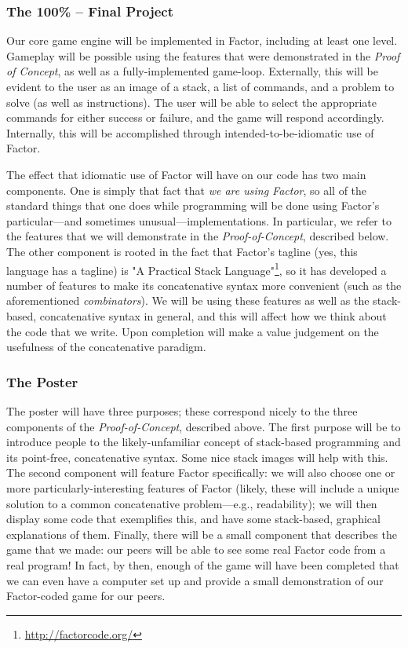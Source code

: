 \documentclass{sig-alternate}
\begin{document}
\subsubsection*{The 100\% -- Final Project} 
Our core game engine will be implemented in Factor, including at least one level. Gameplay will be possible using the features that were demonstrated in the \textit{Proof of Concept}, as well as a fully-implemented game-loop. Externally, this will be evident to the user as an image of a stack, a list of commands, and a problem to solve (as well as instructions). The user will be able to select the appropriate commands for either success or failure, and the game will respond accordingly. Internally, this will be accomplished through intended-to-be-idiomatic use of Factor.

The effect that idiomatic use of Factor will have on our code has two main components. One is simply that fact that \textit{we are using Factor}, so all of the standard things that one does while programming will be done using Factor's particular---and sometimes unusual---implementations. In particular, we refer to the features that we will demonstrate in the \textit{Proof-of-Concept}, described below. The other component is rooted in the fact that Factor's tagline (yes, this language has a tagline) is "A Practical Stack Language"\footnote{\url{http://factorcode.org/}}, so it has developed a number of features to make its concatenative syntax more convenient (such as the aforementioned \textit{combinators}). We will be using these features as well as the stack-based, concatenative syntax in general, and this will affect how we think about the code that we write. Upon completion will make a value judgement on the usefulness of the concatenative paradigm.

\subsubsection*{The Poster}
The poster will have three purposes; these correspond nicely to the three components of the \textit{Proof-of-Concept}, described above. The first purpose will be to introduce people to the likely-unfamiliar concept of stack-based programming and its point-free, concatenative syntax. Some nice stack images will help with this. The second component will feature Factor specifically: we will also choose one or more particularly-interesting features of Factor (likely, these will include a unique solution to a common concatenative problem---e.g., readability); we will then display some code that exemplifies this, and have some stack-based, graphical explanations of them. Finally, there will be a small component that describes the game that we made: our peers will be able to see some real Factor code from a real program! In fact, by then, enough of the game will have been completed that we can even have a computer set up and provide a small demonstration of our Factor-coded game for our peers.
\end{document}
